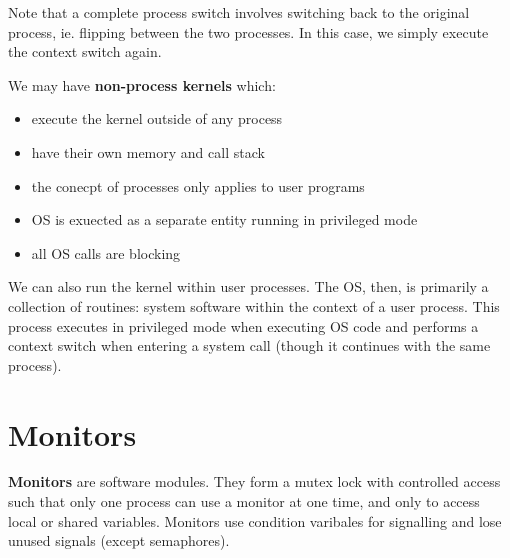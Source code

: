 \documentclass[12pt]{article}
\begin{document}
Note that a complete process switch involves switching back to the original process, ie. flipping between the two processes. In this case, we simply execute the context switch again.

We may have {\bf non-process kernels} which:
\begin{itemize}
\item execute the kernel outside of any process
\item have their own memory and call stack
\item the conecpt of processes only applies to user programs
\item OS is exuected as a separate entity running in privileged mode
\item all OS calls are blocking
\end{itemize}

We can also run the kernel within user processes. The OS, then, is primarily a collection of routines: system software within the context of a user process. This process executes in privileged mode when executing OS code and performs a context switch when entering a system call (though it continues with the same process).


\section{Monitors}
{\bf Monitors} are software modules. They form a mutex lock with controlled access such that only one process can use a monitor at one time, and only to access local or shared variables. Monitors use condition varibales for signalling and lose unused signals (except semaphores).
\end{document}
